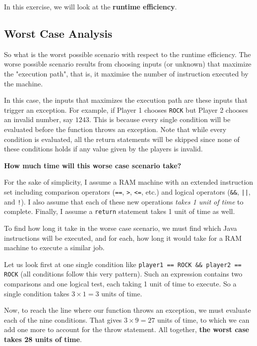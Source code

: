 \documentclass[11pt]{article}
\begin{document}
In this exercise, we will look at the \textbf{runtime efficiency}.

\subsection{Worst Case Analysis}
\label{sec:orgcdf080d}

So what is the worst possible scenario with respect to the runtime
efficiency. The worse possible scenario results from choosing inputs
(or unknown) that maximize the "execution path", that is, it maximise
the number of instruction executed by the machine.

In this case, the inputs that maximizes the execution path are these
inputs that trigger an exception. For example, if Player 1 chooses
\texttt{ROCK} but Player 2 chooses an invalid number, say \(1243\). This is
because every single condition will be evaluated before the function
throws an exception. Note that while every condition is evaluated, all
the return statements will be skipped since none of these conditions holds
if any value given by the players is invalid.

\textbf{How much time will this worse case scenario take?}

For the sake of simplicity, I assume a RAM machine with an extended
instruction set including comparison operators (\texttt{==}, \texttt{>}, \texttt{<=}, etc.)
and logical operators (\texttt{\&\&}, \texttt{||}, and \texttt{!}). I also assume that each
of these new operations \emph{takes 1 unit of time} to complete. Finally, I
assume a \texttt{return} statement takes 1 unit of time as well.

To find how long it take in the worse case scenario, we must find
which Java instructions will be executed, and for each, how long it
would take for a RAM machine to execute a similar job.

Let us look first at one single condition like \texttt{player1 == ROCK \&\&
player2 == ROCK} (all conditions follow this very pattern). Such an
expression contains two comparisons and one logical test, each taking
1 unit of time to execute. So a single condition takes \(3 \times 1 =
3\) units of time.

Now, to reach the line where our function throws an exception, we must
evaluate each of the nine conditions. That gives \(3 \times 9 = 27\)
units of time, to which we can add one more to account for the throw
statement. All together, \textbf{the worst case takes 28 units of time}.
\end{document}

